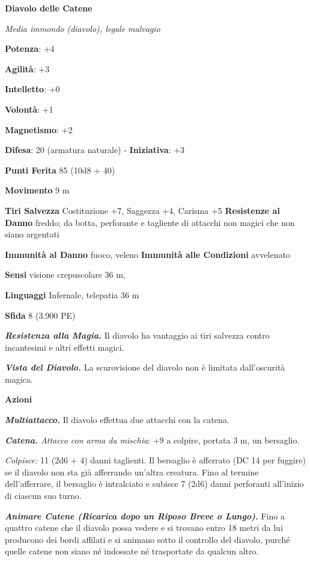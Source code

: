\begin{multicols}{2}
\textbf{Diavolo delle Catene}

\emph{Media immondo (diavolo), legale malvagio}

\textbf{Potenza}: +4

\textbf{Agilità}: +3

\textbf{Intelletto}: +0

\textbf{Volontà}: +1

\textbf{Magnetismo}: +2

\textbf{Difesa}: 20 (armatura naturale) - \textbf{Iniziativa}: +3

\textbf{Punti Ferita} 85 (10d8 + 40)

\textbf{Movimento} 9 m

\textbf{Tiri Salvezza} Costituzione +7, Saggezza +4, Carisma +5
\textbf{Resistenze al Danno} freddo; da botta, perforante e tagliente
di attacchi non magici che non siano argentati

\textbf{Immunità al Danno} fuoco, veleno \textbf{Immunità alle
Condizioni} avvelenato

\textbf{Sensi} visione crepuscolare 36 m, 

\textbf{Linguaggi} Infernale, telepatia 36 m 

\textbf{Sfida} 8 (3.900 PE)\smallskip

\emph{\textbf{Resistenza alla Magia.}} Il diavolo ha vantaggio ai tiri
salvezza contro incantesimi e altri effetti magici.

\emph{\textbf{Vista del Diavolo.}} La scurovisione del diavolo non è
limitata dall'oscurità magica.

\smallskip\textbf{Azioni}

\emph{\textbf{Multiattacco.}} Il diavolo effettua due attacchi con la
catena.

\emph{\textbf{Catena.} Attacco con arma da mischia}: +9 a colpire,
portata 3 m, un bersaglio.

\emph{Colpisce:} 11 (2d6 + 4) danni taglienti. Il bersaglio è afferrato
(DC 14 per fuggire) se il diavolo non sta già afferrando un'altra
creatura. Fino al termine dell'afferrare, il bersaglio è intralciato e
subisce 7 (2d6) danni perforanti all'inizio di ciascun suo turno.

\emph{\textbf{Animare Catene (Ricarica dopo un Riposo Breve o Lungo).}}
Fino a quattro catene che il diavolo possa vedere e si trovano entro 18
metri da lui producono dei bordi affilati e si animano sotto il
controllo del diavolo, purché quelle catene non siano né indossate né
trasportate da qualcun altro.


\end{multicols}
